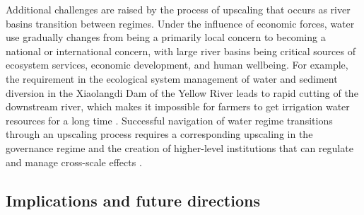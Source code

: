 \documentclass[9pt, twocolumn, twoside, lineno]{pnas-new}
\begin{document}
Additional challenges are raised by the process of upscaling that occurs as river basins transition between regimes. Under the influence of economic forces, water use gradually changes from being a primarily local concern to becoming a national or international concern, with large river basins being critical sources of ecosystem services, economic development, and human wellbeing. 
For example, the requirement in the ecological system management of water and sediment diversion in the Xiaolangdi Dam of the Yellow River leads to rapid cutting of the downstream river, which makes it impossible for farmers to get irrigation water resources for a long time 
\cite{kongEnvironmentalimpactassessments2017}.
Successful navigation of water regime transitions through an upscaling process requires a corresponding upscaling in the governance regime and the creation of higher-level institutions that can regulate and manage cross-scale effects 
\cite{cummingQuantifyingSocialEcologicalScale2020}. 

\subsection*{Implications and future directions}
\label{Outlook}
\end{document}
